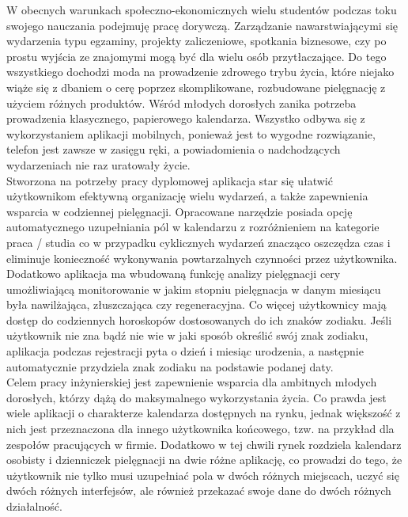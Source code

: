 \phantom{Th} 
W obecnych warunkach społeczno-ekonomicznych wielu studentów podczas toku swojego nauczania podejmuję pracę dorywczą. Zarządzanie nawarstwiającymi się wydarzenia typu egzaminy, projekty zaliczeniowe, spotkania biznesowe, czy po prostu wyjścia ze znajomymi mogą być dla wielu osób przytłaczające. Do tego wszystkiego dochodzi moda na prowadzenie zdrowego trybu życia, które niejako wiąże się z dbaniem o cerę poprzez skomplikowane, rozbudowane pielęgnację z użyciem różnych produktów. Wśród młodych dorosłych zanika potrzeba prowadzenia klasycznego, papierowego kalendarza. Wszystko odbywa się z wykorzystaniem aplikacji mobilnych, ponieważ jest to wygodne rozwiązanie, telefon jest zawsze w zasięgu ręki, a powiadomienia o nadchodzących wydarzeniach nie raz uratowały życie. \\

Stworzona na potrzeby pracy dyplomowej aplikacja star się ułatwić użytkownikom efektywną organizację wielu wydarzeń, a także zapewnienia wsparcia w codziennej pielęgnacji. Opracowane narzędzie posiada opcję automatycznego uzupełniania pól w kalendarzu z rozróżnieniem na kategorie praca / studia co w przypadku cyklicznych wydarzeń znacząco oszczędza czas i eliminuje konieczność wykonywania powtarzalnych czynności przez użytkownika. Dodatkowo aplikacja ma wbudowaną funkcję analizy pielęgnacji cery umożliwiającą monitorowanie w jakim stopniu pielęgnacja w danym miesiącu była nawilżająca, złuszczająca czy regeneracyjna. Co więcej użytkownicy mają dostęp do codziennych horoskopów dostosowanych do ich znaków zodiaku. Jeśli użytkownik nie zna bądź nie wie w jaki sposób określić swój znak zodiaku, aplikacja podczas rejestracji pyta o dzień i miesiąc urodzenia, a następnie automatycznie przydziela znak zodiaku na podstawie podanej daty. \\


Celem pracy inżynierskiej jest zapewnienie wsparcia dla ambitnych młodych dorosłych, którzy dążą do maksymalnego wykorzystania życia. Co prawda jest wiele aplikacji o charakterze kalendarza dostępnych na rynku, jednak większość z nich jest przeznaczona dla innego użytkownika końcowego, tzw. na przykład dla zespołów pracujących w firmie. Dodatkowo w tej chwili rynek rozdziela kalendarz osobisty i dzienniczek pielęgnacji na dwie różne aplikację, co prowadzi do tego, że użytkownik nie tylko musi uzupełniać pola w dwóch różnych miejscach, uczyć się dwóch różnych interfejsów, ale również przekazać swoje dane do dwóch różnych działalność.\\ 
